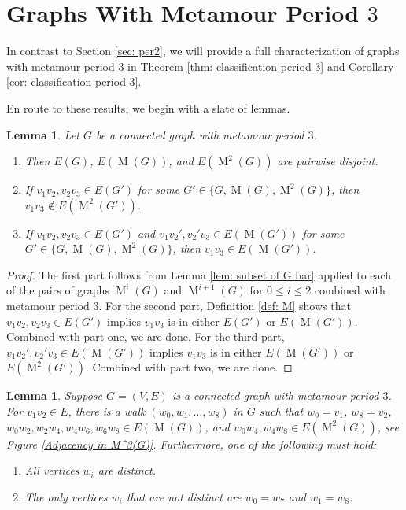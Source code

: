 \documentclass[12pt]{amsart}
\newtheorem{lemma}[theorem]{Lemma}
\theoremstyle{definition}
\theoremstyle{remark}
\numberwithin{equation}{section}
\numberwithin{figure}{section}
\newcommand{\M}{\operatorname{M}}
\begin{document}
\section{Graphs With Metamour Period $3$} 

In contrast to Section \ref{sec: per2}, we will provide a full characterization of graphs with metamour period $3$ in Theorem \ref{thm: classification period 3} and Corollary \ref{cor: classification period 3}. 

En route to these results, we begin with a slate of lemmas.
\begin{lemma} \label{Disjointedness}
    Let $G$ be a connected graph with metamour period $3$.
    \begin{enumerate}
        \item Then $E(G)$, $E(\M(G))$, and $E(\M^2(G))$ are pairwise disjoint.
        \item If $v_1v_2,v_2v_3 \in E(G')$ for some $G' \in \{G,\M(G),\M^2(G)\}$, then $v_1v_3 \notin E(\M^2(G'))$.
        \item If $v_1v_2,v_2v_3 \in E(G')$ and $v_1v_2',v_2'v_3 \in E(\M(G'))$ for some $G' \in \{G,\M(G),\M^2(G)\}$, then $v_1v_3 \in E(\M(G'))$.
    \end{enumerate}
\end{lemma}

\begin{proof}
    The first part follows from Lemma \ref{lem: subset of G bar} applied to each of the pairs of graphs $\M^i(G)$ and $\M^{i+1}(G)$ for $0\leq i \leq 2$ combined with metamour period $3$. 
    For the second part, Definition \ref{def: M} shows that $v_1v_2,v_2v_3 \in E(G')$ implies $v_1 v_3$ is in either $E(G')$ or $E(\M(G'))$. Combined with part one, we are done. 
    For the third part, $v_1v_2',v_2'v_3 \in E(\M(G'))$ implies $v_1 v_3$ is in either $E(\M(G'))$ or $E(\M^2(G'))$. Combined with part two, we are done.
\end{proof}

\begin{lemma} \label{trail condition}
    Suppose $G=(V,E)$ is a connected graph with metamour period $3$. For $v_1v_2 \in E$, there is a walk $(w_0,w_1,\dots,w_8)$ in $G$ such that $w_0=v_1$, $w_8 = v_2$, $w_0w_2, w_2w_4, w_4w_6, w_6w_8 \in E(\M(G))$, and $w_0w_4, w_4w_8 \in E(\M^2(G))$, see Figure \ref{Adjacency in M^3(G)}. Furthermore, one of the following must hold:
    \begin{enumerate}
        \item All vertices $w_i$ are distinct.
        \item The only vertices $w_i$ that are not distinct are $w_0 = w_7$ and $w_1 = w_8$.
    \end{enumerate}
\end{lemma}
\end{document}
